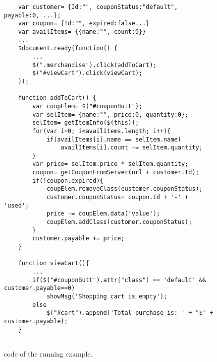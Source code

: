 \begin{figure}
\begin{lstlisting}
	var customer= {Id:"", couponStatus:"default", payable:0, ...};
	var coupon= {Id:"", expired:false...}
	var availItems= {{name:"", count:0}}
	...
	$document.ready(function() {
		...	
		$(".merchandise").click(addToCart);
		$("#viewCart").click(viewCart);
	});
	
	function addToCart() {
		var coupElem= $("#couponButt");
		var selItem= {name:"", price:0, quantity:0};
		selItem= getItemInfo($(this));
		for(var i=0; i<availItems.length; i++){
			if(availItems[i].name == selItem.name)
				availItems[i].count -= selItem.quantity;		
		}
		var price= selItem.price * selItem.quantity;
		coupon= getCouponFromServer(url + customer.Id);
		if(!coupon.expired){
			coupElem.removeClass(customer.couponStatus);
			customer.couponStatus= coupon.Id + '-' + 'used';
			price -= coupElem.data('value');	
			coupElem.addClass(customer.couponStatus);	
		} 	
		customer.payable += price;
	}

	function viewCart(){
		...
		if($("#couponButt").attr("class") == 'default' && customer.payable==0)
			showMsg('Shopping cart is empty');
		else
			$("#cart").append('Total purchase is: ' + "$" + customer.payable);
	}


\end{lstlisting}
\vspace{-0.1in} 

\caption{\javascript code of the running example.}
\label{Fig:example}
\vspace{-0.2in} 

\end{figure}